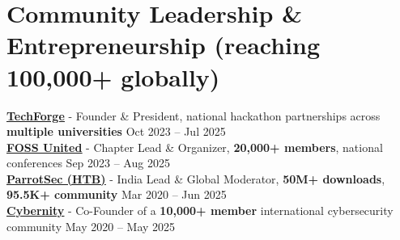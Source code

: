 \documentclass[letterpaper,11pt]{article}
\begin{document}

\section{Community Leadership \& Entrepreneurship {\normalfont\small (reaching 100,000+ globally)}}
 \begin{itemize}[leftmargin=0.05in, label={}]
    \small{\item{
     \textbf{\href{https://techforge.jnnce.ac.in/}{\underline{TechForge}}} - Founder \& President, national hackathon partnerships across \textbf{multiple universities} \hfill Oct 2023 -- Jul 2025\\
     \textbf{\href{https://fossunited.org/}{\underline{FOSS United}}} - Chapter Lead \& Organizer, \textbf{20,000+ members}, national conferences \hfill Sep 2023 -- Aug 2025\\
     \textbf{\href{https://parrotsec.org/}{\underline{ParrotSec (HTB)}}} - India Lead \& Global Moderator, \textbf{50M+ downloads}, \textbf{95.5K+ community} \hfill Mar 2020 -- Jun 2025\\
     \textbf{\href{https://cybernity.org/}{\underline{Cybernity}}} - Co-Founder of a \textbf{10,000+ member} international cybersecurity community \hfill May 2020 -- May 2025
     }}
 \end{itemize}
\end{document}
